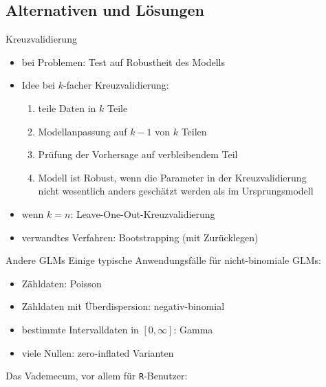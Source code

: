 \subsection{Alternativen und Lösungen}

\begin{frame}
  {Kreuzvalidierung}
  \begin{itemize}[<+->]
    \item bei Problemen: Test auf \alert{Robustheit des Modells}
    \item Idee bei $k$-facher Kreuzvalidierung:
      \begin{enumerate}
	\item teile Daten in $k$ Teile
	\item Modellanpassung auf $k-1$ von $k$ Teilen
	\item Prüfung der Vorhersage auf verbleibendem Teil
	\item Modell ist Robust, wenn die Parameter in der Kreuzvalidierung\\
	  nicht wesentlich anders geschätzt werden als im Ursprungsmodell
      \end{enumerate}
    \item wenn $k=n$: \alert{Leave-One-Out-Kreuzvalidierung}
    \item verwandtes Verfahren: \alert{Bootstrapping} (mit Zurücklegen)
  \end{itemize}
\end{frame}

\begin{frame}
  {Andere GLMs}
  Einige typische Anwendungsfälle für nicht-binomiale GLMs:\\

  \begin{itemize}[<+->]
    \item Zähldaten: \alert{Poisson}
    \item Zähldaten mit Überdispersion: \alert{negativ-binomial}
    \item bestimmte Intervalldaten in $[0,\infty]$: \alert{Gamma}
    \item viele Nullen: \alert{zero-inflated} Varianten
  \end{itemize}
  \pause
  \begin{center}
    Das Vademecum, vor allem für \texttt{R}-Benutzer:\\
    \cite{ZuurEa2009}
  \end{center}
\end{frame}

